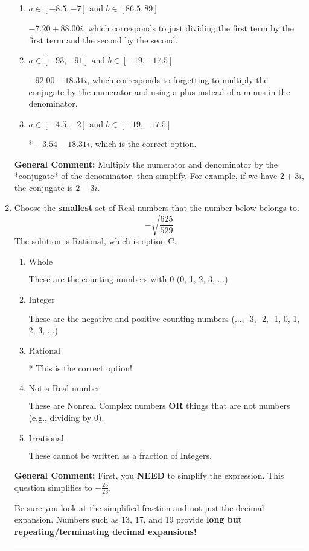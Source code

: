 \documentclass{extbook}[14pt]
\newcommand{\litem}[1]{\item #1

\rule{\textwidth}{0.4pt}}
\begin{document}
\begin{enumerate}
{\begin{enumerate}[label=\Alph*.]
 $-3.54  - 476.00 i$, which corresponds to forgetting to multiply the conjugate by the numerator.
\item \( a \in [-8.5, -7] \text{ and } b \in [86.5, 89] \)

 $-7.20  + 88.00 i$, which corresponds to just dividing the first term by the first term and the second by the second.
\item \( a \in [-93, -91] \text{ and } b \in [-19, -17.5] \)

 $-92.00  - 18.31 i$, which corresponds to forgetting to multiply the conjugate by the numerator and using a plus instead of a minus in the denominator.
\item \( a \in [-4.5, -2] \text{ and } b \in [-19, -17.5] \)

* $-3.54  - 18.31 i$, which is the correct option.
\end{enumerate}

\textbf{General Comment:} Multiply the numerator and denominator by the *conjugate* of the denominator, then simplify. For example, if we have $2+3i$, the conjugate is $2-3i$.
}
\litem{
Choose the \textbf{smallest} set of Real numbers that the number below belongs to.
\[ -\sqrt{\frac{625}{529}} \]The solution is \( \text{Rational} \), which is option C.\begin{enumerate}[label=\Alph*.]
\item \( \text{Whole} \)

These are the counting numbers with 0 (0, 1, 2, 3, ...)
\item \( \text{Integer} \)

These are the negative and positive counting numbers (..., -3, -2, -1, 0, 1, 2, 3, ...)
\item \( \text{Rational} \)

* This is the correct option!
\item \( \text{Not a Real number} \)

These are Nonreal Complex numbers \textbf{OR} things that are not numbers (e.g., dividing by 0).
\item \( \text{Irrational} \)

These cannot be written as a fraction of Integers.
\end{enumerate}

\textbf{General Comment:} First, you \textbf{NEED} to simplify the expression. This question simplifies to $-\frac{25}{23}$. 
 
 Be sure you look at the simplified fraction and not just the decimal expansion. Numbers such as 13, 17, and 19 provide \textbf{long but repeating/terminating decimal expansions!} 
 
}
\end{enumerate}
\end{document}
